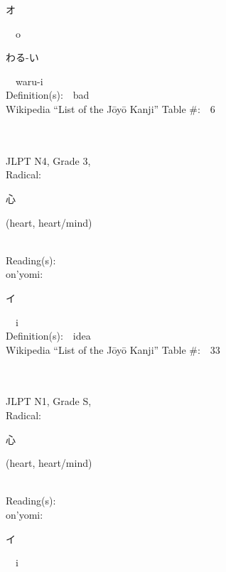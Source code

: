 \begin{multicols}{2}
{\hspace*{2em}}{\begin{CJK}{UTF8}{min} オ \end{CJK}}\ \ o\ \ \\
{\hspace*{2em}}{\begin{CJK}{UTF8}{min} わる-い \end{CJK}}\ \ waru-i\ \ \\
Definition(s):\ \ bad \\
Wikipedia ``List of the J\=oy\=o Kanji'' Table \#:\ \ 6 \\
\ \ \\
{\fontsize{34pt}{40pt}  }\ \ \\  %
{JLPT N4, Grade 3, \\Radical:\ \ {\begin{CJK}{UTF8}{min} 心 \end{CJK}} (heart, heart/mind) } \\
Reading(s):\ \ \\
{\hspace*{1em}}on'yomi:\ \ \\
{\hspace*{2em}}{\begin{CJK}{UTF8}{min} イ \end{CJK}}\ \ i\ \ \\
Definition(s):\ \ idea \\
Wikipedia ``List of the J\=oy\=o Kanji'' Table \#:\ \ 33 \\
\ \ \\
{\fontsize{34pt}{40pt}  }\ \ \\
{JLPT N1, Grade S, \\Radical:\ \ {\begin{CJK}{UTF8}{min} 心 \end{CJK}} (heart, heart/mind) } \\
Reading(s):\ \ \\
{\hspace*{1em}}on'yomi:\ \ \\
{\hspace*{2em}}{\begin{CJK}{UTF8}{min} イ \end{CJK}}\ \ i\ \ \\

\end{multicols}
